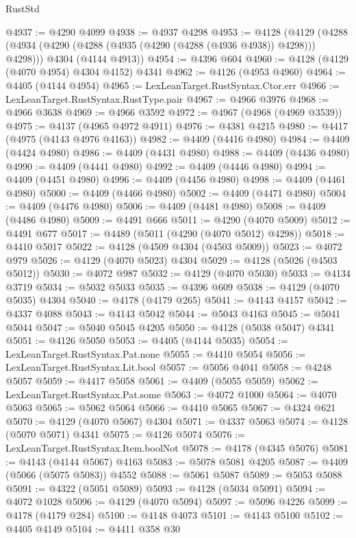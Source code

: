 \begin{lexlean}{RustStd}
\begin{coremodule}
@4937 := @4290 @4099
@4938 := @4937 @4298
@4953 := @4128
    (@4129
      (@4288 (@4934 (@4290 (@4288 (@4935 (@4290 (@4288 (@4936 @4938)) @4298))) @4298)))
      @4304
      (@4144 @4913))
@4954 := @4396 @604
@4960 := @4128 (@4129 (@4070 @4954) @4304 @4152) @4341
@4962 := @4126 (@4953 @4960)
@4964 := @4405 (@4144 @4954)
@4965 := LexLeanTarget.RustSyntax.Ctor.err
@4966 := LexLeanTarget.RustSyntax.RustType.pair
@4967 := @4966 @3976
@4968 := @4966 @3638
@4969 := @4966 @3592
@4972 := @4967 (@4968 (@4969 @3539))
@4975 := @4137 (@4965 @4972 @4911)
@4976 := @4381 @4215
@4980 := @4417 (@4975 (@4143 @4976 @4163))
@4982 := @4409 (@4416 @4980)
@4984 := @4409 (@4424 @4980)
@4986 := @4409 (@4431 @4980)
@4988 := @4409 (@4436 @4980)
@4990 := @4409 (@4441 @4980)
@4992 := @4409 (@4446 @4980)
@4994 := @4409 (@4451 @4980)
@4996 := @4409 (@4456 @4980)
@4998 := @4409 (@4461 @4980)
@5000 := @4409 (@4466 @4980)
@5002 := @4409 (@4471 @4980)
@5004 := @4409 (@4476 @4980)
@5006 := @4409 (@4481 @4980)
@5008 := @4409 (@4486 @4980)
@5009 := @4491 @666
@5011 := @4290 (@4070 @5009)
@5012 := @4491 @677
@5017 := @4489 (@5011 (@4290 (@4070 @5012) @4298))
@5018 := @4410 @5017
@5022 := @4128 (@4509 @4304 (@4503 @5009))
@5023 := @4072 @979
@5026 := @4129 (@4070 @5023) @4304
@5029 := @4128 (@5026 (@4503 @5012))
@5030 := @4072 @987
@5032 := @4129 (@4070 @5030)
@5033 := @4134 @3719
@5034 := @5032 @5033
@5035 := @4396 @609
@5038 := @4129 (@4070 @5035) @4304
@5040 := @4178 (@4179 @265)
@5041 := @4143 @4157
@5042 := @4337 @4088
@5043 := @4143 @5042
@5044 := @5043 @4163
@5045 := @5041 @5044
@5047 := @5040 @5045 @4205
@5050 := @4128 (@5038 @5047) @4341
@5051 := @4126 @5050
@5053 := @4405 (@4144 @5035)
@5054 := LexLeanTarget.RustSyntax.Pat.none
@5055 := @4410 @5054
@5056 := LexLeanTarget.RustSyntax.Lit.bool
@5057 := @5056 @4041
@5058 := @4248 @5057
@5059 := @4417 @5058
@5061 := @4409 (@5055 @5059)
@5062 := LexLeanTarget.RustSyntax.Pat.some
@5063 := @4072 @1000
@5064 := @4070 @5063
@5065 := @5062 @5064
@5066 := @4410 @5065
@5067 := @4324 @621
@5070 := @4129 (@4070 @5067) @4304
@5071 := @4337 @5063
@5074 := @4128 (@5070 @5071) @4341
@5075 := @4126 @5074
@5076 := LexLeanTarget.RustSyntax.Item.boolNot
@5078 := @4178 (@4345 @5076)
@5081 := @4143 (@4144 @5067) @4163
@5083 := @5078 @5081 @4205
@5087 := @4409 (@5066 (@5075 @5083)) @4552
@5088 := @5061 @5087
@5089 := @5053 @5088
@5091 := @4322 (@5051 @5089)
@5093 := @4128 (@5034 @5091)
@5094 := @4072 @1028
@5096 := @4129 (@4070 @5094)
@5097 := @5096 @4226
@5099 := @4178 (@4179 @284)
@5100 := @4148 @4073
@5101 := @4143 @5100
@5102 := @4405 @4149
@5104 := @4411 @358 @30

\end{coremodule}
\end{lexlean}
